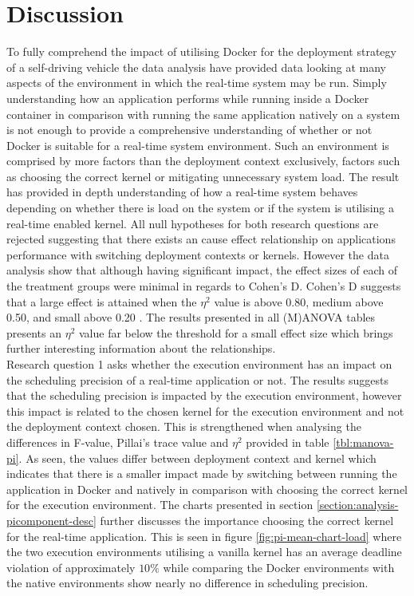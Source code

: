 \iffalse  \fi
\chapter{Discussion} \label{section:discussion}

To fully comprehend the impact of utilising Docker for the deployment strategy of a self-driving vehicle the data analysis have provided data looking at many aspects of the environment in which the real-time system may be run. Simply understanding how an application performs while running inside a Docker container in comparison with running the same application natively on a system is not enough to provide a comprehensive understanding of whether or not Docker is suitable for a real-time system environment. Such an environment is comprised by more factors than the deployment context exclusively, factors such as choosing the correct kernel or mitigating unnecessary system load. The result has provided in depth understanding of how a real-time system behaves depending on whether there is load on the system or if the system is utilising a real-time enabled kernel. All null hypotheses for both research questions are rejected suggesting that there exists an cause effect relationship on applications performance with switching deployment contexts or kernels. However the data analysis show that although having significant impact, the effect sizes of each of the treatment groups were minimal in regards to Cohen's D. Cohen's D suggests that a large effect is attained when the $\eta^{2}$ value is above 0.80, medium above 0.50, and small above 0.20 \cite{jackson2013statistics}. The results presented in all (M)ANOVA tables presents an $\eta^{2}$ value far below the threshold for a small effect size which brings further interesting information about the relationships.\\

Research question 1 asks whether the execution environment has an impact on the scheduling precision of a real-time application or not. The results suggests that the scheduling precision is impacted by the execution environment, however this impact is related to the chosen kernel for the execution environment and not the deployment context chosen. This is strengthened when analysing the differences in F-value, Pillai's trace value and $\eta^{2}$ provided in table \ref{tbl:manova-pi}. As seen, the values differ between deployment context and kernel which indicates that there is a smaller impact made by switching between running the application in Docker and natively in comparison with choosing the correct kernel for the execution environment. The charts presented in section \ref{section:analysis-picomponent-desc} further discusses the importance choosing the correct kernel for the real-time application. This is seen in figure \ref{fig:pi-mean-chart-load} where the two execution environments utilising a vanilla kernel has an average deadline violation of approximately $10\%$ while comparing the Docker environments with the native environments show nearly no difference in scheduling precision.\\

